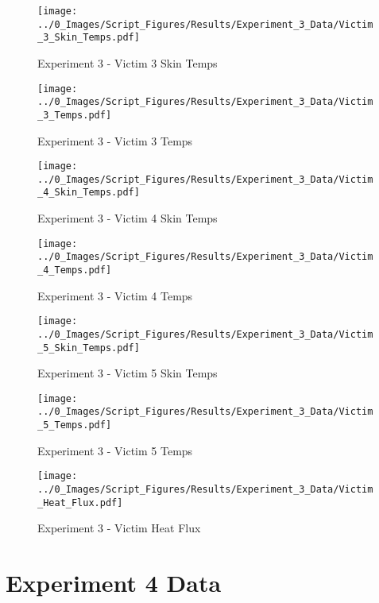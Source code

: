 	\begin{figure}[H]
		\centering
		\texttt{[image: ../0\_Images/Script\_Figures/Results/Experiment\_3\_Data/Victim\_3\_Skin\_Temps.pdf]}
		\caption[]{Experiment 3 - Victim 3 Skin Temps}
	\end{figure}
 
	\clearpage

	\begin{figure}[H]
		\centering
		\texttt{[image: ../0\_Images/Script\_Figures/Results/Experiment\_3\_Data/Victim\_3\_Temps.pdf]}
		\caption[]{Experiment 3 - Victim 3 Temps}
	\end{figure}
 

	\begin{figure}[H]
		\centering
		\texttt{[image: ../0\_Images/Script\_Figures/Results/Experiment\_3\_Data/Victim\_4\_Skin\_Temps.pdf]}
		\caption[]{Experiment 3 - Victim 4 Skin Temps}
	\end{figure}
 
	\clearpage

	\begin{figure}[H]
		\centering
		\texttt{[image: ../0\_Images/Script\_Figures/Results/Experiment\_3\_Data/Victim\_4\_Temps.pdf]}
		\caption[]{Experiment 3 - Victim 4 Temps}
	\end{figure}
 

	\begin{figure}[H]
		\centering
		\texttt{[image: ../0\_Images/Script\_Figures/Results/Experiment\_3\_Data/Victim\_5\_Skin\_Temps.pdf]}
		\caption[]{Experiment 3 - Victim 5 Skin Temps}
	\end{figure}
 
	\clearpage

	\begin{figure}[H]
		\centering
		\texttt{[image: ../0\_Images/Script\_Figures/Results/Experiment\_3\_Data/Victim\_5\_Temps.pdf]}
		\caption[]{Experiment 3 - Victim 5 Temps}
	\end{figure}
 

	\begin{figure}[H]
		\centering
		\texttt{[image: ../0\_Images/Script\_Figures/Results/Experiment\_3\_Data/Victim\_Heat\_Flux.pdf]}
		\caption[]{Experiment 3 - Victim Heat Flux}
	\end{figure}
 
	\clearpage

\clearpage		\large
\section{Experiment 4 Data} \label{App:Exp4Results} 

